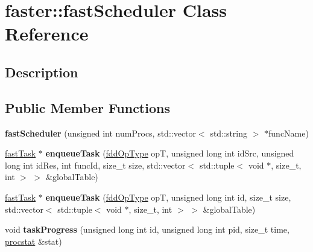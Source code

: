 \hypertarget{classfaster_1_1fastScheduler}{}\section{faster\+:\+:fast\+Scheduler Class Reference}
\label{classfaster_1_1fastScheduler}


\subsection{Description}
\subsection*{Public Member Functions}
\begin{DoxyCompactItemize}
\item 
\hypertarget{classfaster_1_1fastScheduler_a5585b9363737823bf17e6782013b04a8}{}\label{classfaster_1_1fastScheduler_a5585b9363737823bf17e6782013b04a8} 
{\bfseries fast\+Scheduler} (unsigned int num\+Procs, std\+::vector$<$ std\+::string $>$ $\ast$func\+Name)
\item 
\hypertarget{classfaster_1_1fastScheduler_a25353e0b9cac5c731973ea0d453080e0}{}\label{classfaster_1_1fastScheduler_a25353e0b9cac5c731973ea0d453080e0} 
\hyperlink{classfaster_1_1fastTask}{fast\+Task} $\ast$ {\bfseries enqueue\+Task} (\hyperlink{namespacefaster_a64379512d12d41c6e58f176939abfd80}{fdd\+Op\+Type} opT, unsigned long int id\+Src, unsigned long int id\+Res, int func\+Id, size\+\_\+t size, std\+::vector$<$ std\+::tuple$<$ void $\ast$, size\+\_\+t, int $>$ $>$ \&global\+Table)
\item 
\hypertarget{classfaster_1_1fastScheduler_a3adc513709d0c00d1d6b9f62115c9284}{}\label{classfaster_1_1fastScheduler_a3adc513709d0c00d1d6b9f62115c9284} 
\hyperlink{classfaster_1_1fastTask}{fast\+Task} $\ast$ {\bfseries enqueue\+Task} (\hyperlink{namespacefaster_a64379512d12d41c6e58f176939abfd80}{fdd\+Op\+Type} opT, unsigned long int id, size\+\_\+t size, std\+::vector$<$ std\+::tuple$<$ void $\ast$, size\+\_\+t, int $>$ $>$ \&global\+Table)
\item 
\hypertarget{classfaster_1_1fastScheduler_a09db7fd6c9076e26dea68a7c925bf531}{}\label{classfaster_1_1fastScheduler_a09db7fd6c9076e26dea68a7c925bf531} 
void {\bfseries task\+Progress} (unsigned long int id, unsigned long int pid, size\+\_\+t time, \hyperlink{classfaster_1_1procstat}{procstat} \&stat)
\item 
\hypertarget{classfaster_1_1fastScheduler_af657bff84b9c117625135ca0c8f4ccf6}{}\label{classfaster_1_1fastScheduler_af657bff84b9c117625135ca0c8f4ccf6} 

\end{DoxyCompactItemize}
